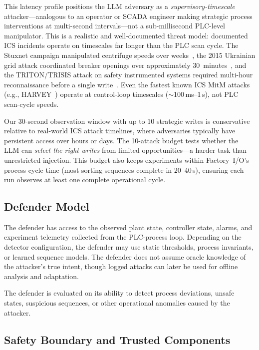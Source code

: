 This latency profile positions the LLM adversary as a \emph{supervisory-timescale} attacker---analogous to an operator or SCADA engineer making strategic process interventions at multi-second intervals---not a sub-millisecond PLC-level manipulator. This is a realistic and well-documented threat model: documented ICS incidents operate on timescales far longer than the PLC scan cycle. The Stuxnet campaign manipulated centrifuge speeds over weeks~\cite{langner2011stuxnet}, the 2015 Ukrainian grid attack coordinated breaker openings over approximately 30~minutes~\cite{liang2017ukraine}, and the TRITON/TRISIS attack on safety instrumented systems required multi-hour reconnaissance before a single write~\cite{johnson2017triton}. Even the fastest known ICS MitM attacks (e.g., HARVEY~\cite{garcia2017harvey}) operate at control-loop timescales (${\sim}$100\,ms--1\,s), not PLC scan-cycle speeds.

Our 30-second observation window with up to 10 strategic writes is conservative relative to real-world ICS attack timelines, where adversaries typically have persistent access over hours or days. The 10-attack budget tests whether the LLM can \emph{select the right writes} from limited opportunities---a harder task than unrestricted injection. This budget also keeps experiments within Factory~I/O's process cycle time (most sorting sequences complete in 20--40\,s), ensuring each run observes at least one complete operational cycle.

\subsection{Defender Model}

The defender has access to the observed plant state, controller state, alarms, and experiment telemetry collected from the PLC-process loop. Depending on the detector configuration, the defender may use static thresholds, process invariants, or learned sequence models. The defender does not assume oracle knowledge of the attacker’s true intent, though logged attacks can later be used for offline analysis and adaptation.

The defender is evaluated on its ability to detect process deviations, unsafe states, suspicious sequences, or other operational anomalies caused by the attacker.

\subsection{Safety Boundary and Trusted Components}

